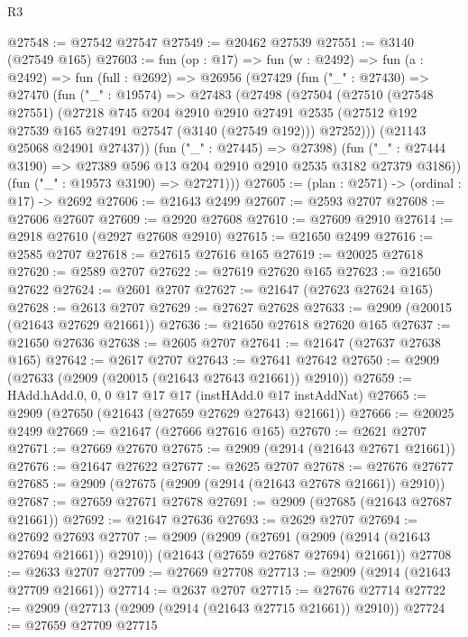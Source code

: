 \begin{lexlean}{R3}
\begin{coremodule}
@27548 := @27542 @27547
@27549 := @20462 @27539
@27551 := @3140 (@27549 @165)
@27603 := fun (op : @17) =>
  fun (w : @2492) =>
  fun (a : @2492) =>
  fun (full : @2692) =>
  @26956
    (@27429
      (fun ("_" : @27430) =>
      @27470
        (fun ("_" : @19574) =>
        @27483
          (@27498
            (@27504
              (@27510
                (@27548 @27551)
                (@27218
                  @745
                  @204
                  @2910
                  @2910
                  @27491
                  @2535
                  (@27512 @192 @27539 @165 @27491 @27547 (@3140 (@27549 @192)))
                  @27252)))
            (@21143 @25068 @24901 @27437))
          (fun ("_" : @27445) => @27398)
          (fun ("_" : @27444 @3190) => @27389 @596 @13 @204 @2910 @2910 @2535 @3182 @27379 @3186))
        (fun ("_" : @19573 @3190) => @27271)))
@27605 := (plan : @2571) -> (ordinal : @17) -> @2692
@27606 := @21643 @2499
@27607 := @2593 @2707
@27608 := @27606 @27607
@27609 := @2920 @27608
@27610 := @27609 @2910
@27614 := @2918 @27610 (@2927 @27608 @2910)
@27615 := @21650 @2499
@27616 := @2585 @2707
@27618 := @27615 @27616 @165
@27619 := @20025 @27618
@27620 := @2589 @2707
@27622 := @27619 @27620 @165
@27623 := @21650 @27622
@27624 := @2601 @2707
@27627 := @21647 (@27623 @27624 @165)
@27628 := @2613 @2707
@27629 := @27627 @27628
@27633 := @2909 (@20015 (@21643 @27629 @21661))
@27636 := @21650 @27618 @27620 @165
@27637 := @21650 @27636
@27638 := @2605 @2707
@27641 := @21647 (@27637 @27638 @165)
@27642 := @2617 @2707
@27643 := @27641 @27642
@27650 := @2909 (@27633 (@2909 (@20015 (@21643 @27643 @21661)) @2910))
@27659 := HAdd.hAdd.{0, 0, 0} @17 @17 @17 (instHAdd.{0} @17 instAddNat)
@27665 := @2909 (@27650 (@21643 (@27659 @27629 @27643) @21661))
@27666 := @20025 @2499
@27669 := @21647 (@27666 @27616 @165)
@27670 := @2621 @2707
@27671 := @27669 @27670
@27675 := @2909 (@2914 (@21643 @27671 @21661))
@27676 := @21647 @27622
@27677 := @2625 @2707
@27678 := @27676 @27677
@27685 := @2909 (@27675 (@2909 (@2914 (@21643 @27678 @21661)) @2910))
@27687 := @27659 @27671 @27678
@27691 := @2909 (@27685 (@21643 @27687 @21661))
@27692 := @21647 @27636
@27693 := @2629 @2707
@27694 := @27692 @27693
@27707 := @2909
    (@2909
      (@27691 (@2909 (@2914 (@21643 @27694 @21661)) @2910))
      (@21643 (@27659 @27687 @27694) @21661))
@27708 := @2633 @2707
@27709 := @27669 @27708
@27713 := @2909 (@2914 (@21643 @27709 @21661))
@27714 := @2637 @2707
@27715 := @27676 @27714
@27722 := @2909 (@27713 (@2909 (@2914 (@21643 @27715 @21661)) @2910))
@27724 := @27659 @27709 @27715

\end{coremodule}
\end{lexlean}

